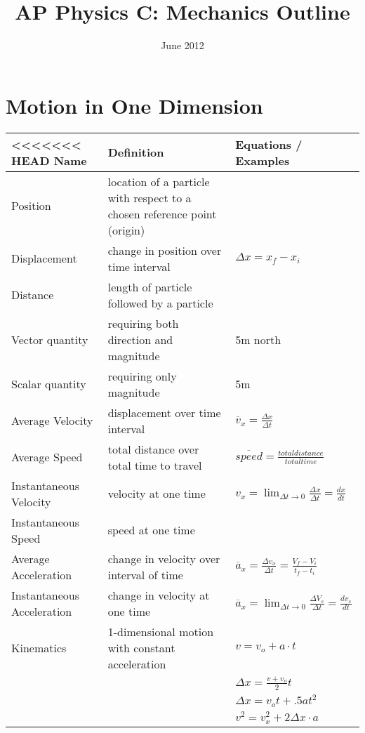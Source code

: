 \documentclass[11pt]{article}
\title{AP Physics C: Mechanics Outline}
\date{June 2012}
\begin{document}
\maketitle
\pagebreak

\section{Motion in One Dimension}
\begin{tabularx}{\textwidth}{l| X l}
<<<<<<< HEAD
    Name & Definition & Equations / Examples \\ \hline
    Position & location of a particle with respect to a chosen reference point (origin) & \\ \hline
    Displacement & change in position over time interval & $ \Delta x=x_{f} - x_{i} $ \bigstrut \\ \hline
    Distance & length of particle followed by a particle & \\ \hline
    Vector quantity & requiring both direction and magnitude & 5m north \\ \hline
    Scalar quantity & requiring only magnitude & 5m \\ \hline
    Average Velocity & displacement over time interval & $ \overline{v}_{x} = \frac{ \Delta x}{ \Delta t } $ \bigstrut \\ \hline
    Average Speed & total distance over total time to travel & $ \overline{speed} = \frac{ total distance }{ total time } $ \bigstrut \\ \hline
    Instantaneous Velocity & velocity at one time & $ v_{x} = \lim_{ \Delta t \to 0} \frac{\Delta x}{\Delta t} = \frac{dx}{dt} $ \bigstrut \\ \hline
    Instantaneous Speed & speed at one time & \\ \hline
    Average Acceleration & change in velocity over interval of time & $ \overline{a}_{x} = \frac{\Delta v_{x}}{\Delta t} = \frac{V_{f}-V_{i}}{t_{f}-t_{i}} $ \bigstrut \\ \hline
    Instantaneous Acceleration & change in velocity at one time & $ \overline{a}_{x} = \lim_{\Delta t \to 0} \frac{\Delta V_{s}}{\Delta t} = \frac{dv_{s}}{dt} $ \bigstrut \\ \hline
    Kinematics & 1-dimensional motion with constant acceleration & $ v= v_{o} + a \cdot t $ \\* & & $ \Delta x = \frac{v + v_{o}}{2}t $ \\* & & $ \Delta x = v_{o}t + .5at^{2} $ \\* & & $ v^{2} = v^{2}_{x}+ 2\Delta x \cdot a$ \bigstrut \\ \hline

\end{tabularx}
\end{document}
